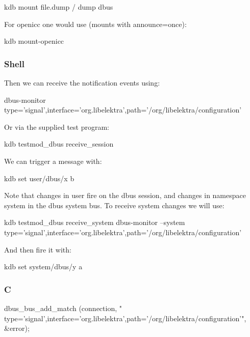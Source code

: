 \begin{DoxyCode}
kdb mount file.dump / dump dbus
\end{DoxyCode}


For openicc one would use (mounts with announce=once)\+:


\begin{DoxyCode}
kdb mount-openicc
\end{DoxyCode}


\subsubsection*{Shell}

Then we can receive the notification events using\+:


\begin{DoxyCode}
dbus-monitor type='signal',interface='org.libelektra',path='/org/libelektra/configuration'
\end{DoxyCode}


Or via the supplied test program\+:


\begin{DoxyCode}
kdb testmod\_dbus receive\_session
\end{DoxyCode}


We can trigger a message with\+:


\begin{DoxyCode}
kdb set user/dbus/x b
\end{DoxyCode}


Note that changes in {\ttfamily user} fire on the dbus {\ttfamily session}, and changes in namespace {\ttfamily system} in the dbus {\ttfamily system} bus. To receive {\ttfamily system} changes we will use\+:


\begin{DoxyCode}
kdb testmod\_dbus receive\_system
dbus-monitor --system type='signal',interface='org.libelektra',path='/org/libelektra/configuration'
\end{DoxyCode}


And then fire it with\+:


\begin{DoxyCode}
kdb set system/dbus/y a
\end{DoxyCode}


\subsubsection*{C}


\begin{DoxyCode}
dbus\_bus\_add\_match (connection, \textcolor{stringliteral}{"
      type='signal',interface='org.libelektra',path='/org/libelektra/configuration'"}, &error);
\end{DoxyCode}



